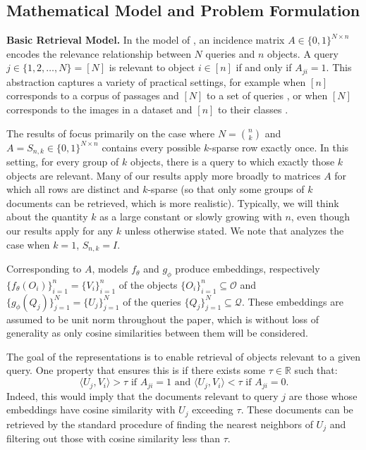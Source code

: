 \documentclass[preprint]{article}
\newcommand{\ksparsen}{S_{n,k}}
\begin{document}
\subsection{Mathematical Model and Problem Formulation}
\label{sec:model}

\textbf{Basic Retrieval Model.} In the model of \cite{weller2025theoretical}, an incidence matrix $A\in \{0,1\}^{N \times n}$ encodes the relevance relationship between $N$ queries and $n$ objects. A query $j \in \{1,2,\ldots, N\} = [N]$ is relevant to object 
$i \in [n]$ if and only if $A_{ji} = 1.$ This abstraction captures a variety of practical settings, for example when $[n]$ corresponds to a corpus of passages and $[N]$ to a set of queries \cite{KarpukhinEtAl2020}, or  when $[N]$ corresponds to the images in a dataset and $[n]$ to their classes \cite{russakovsky2015imagenet}. 

The results of \cite{weller2025theoretical} focus primarily on the case where $N = \binom{n}{k}$ and $A=\ksparsen\in \{0,1\}^{N \times n}$ contains every possible $k$-sparse row exactly once. In this setting, for every group of $k$ objects, there is a query to which exactly those $k$ objects are relevant. 
Many of our results apply more broadly to 
matrices $A$ for which all rows are distinct and $k$-sparse (so that only some groups of $k$ documents can be retrieved, which is more realistic). Typically, we will think about the quantity $k$ as a large constant or slowly growing with $n$, even though our results apply for any $k$ unless otherwise stated. We note that \cite{bangachev2025globalminimizerssigmoidcontrastive} analyzes the case when $k = 1$,  $\ksparsen = I$.

Corresponding to $A$, models $f_\theta$ and $g_\phi$ produce embeddings, respectively $\{f_\theta(O_i)\}_{i = 1}^n = \{V_i\}_{i = 1}^n$ of the objects $\{O_i\}_{i = 1}^n\subseteq \mathcal{O}$ and $\{g_\phi(Q_j)\}_{j = 1}^N = \{U_j\}_{j = 1}^N$ of the queries $\{Q_j\}_{j = 1}^N\subseteq \mathcal{Q}$. These embeddings are assumed to be unit norm throughout the paper, which is without loss of generality as only cosine similarities between them will be considered. 

The goal of the representations is to enable retrieval of objects relevant to a given query. One property that ensures this is if there exists some $\tau\in \mathbb{R}$ such that:
\begin{equation}
\label{eq:zeromarginretrieval}
   \langle U_j, V_i\rangle >\tau \text{ if }A_{ji}=1\text{ and }\langle U_j, V_i\rangle <\tau \text{ if }A_{ji} = 0. 
\end{equation}
Indeed, this would imply that the documents relevant to query $j$ are those whose embeddings have cosine similarity with $U_j$ exceeding $\tau$. These documents can be retrieved by the standard procedure of finding the nearest neighbors of $U_j$ and filtering out those with cosine similarity less than $\tau.$
\end{document}
